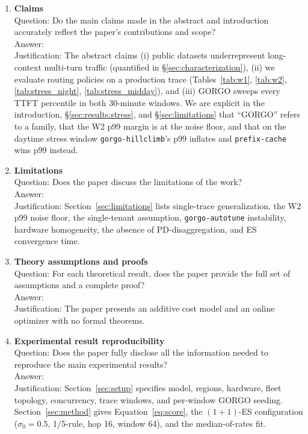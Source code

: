 \documentclass{article}
\begin{document}
\begin{enumerate}

\item {\bf Claims}\\
Question: Do the main claims made in the abstract and introduction accurately reflect the paper's contributions and scope?\\
Answer: \answerYes{}\\
Justification: The abstract claims (i) public datasets underrepresent long-context multi-turn traffic (quantified in \S\ref{sec:characterization}), (ii) we evaluate routing policies on a production trace (Tables~\ref{tab:w1}, \ref{tab:w2}, \ref{tab:stress_night}, \ref{tab:stress_midday}), and (iii) GORGO sweeps every TTFT percentile in both 30-minute windows. We are explicit in the introduction, \S\ref{sec:results:stress}, and \S\ref{sec:limitations} that ``GORGO'' refers to a family, that the W2 p99 margin is at the noise floor, and that on the daytime stress window \texttt{gorgo-hillclimb}'s p99 inflates and \texttt{prefix-cache} wins p99 instead.

\item {\bf Limitations}\\
Question: Does the paper discuss the limitations of the work?\\
Answer: \answerYes{}\\
Justification: Section~\ref{sec:limitations} lists single-trace generalization, the W2 p99 noise floor, the single-tenant assumption, \texttt{gorgo-autotune} instability, hardware homogeneity, the absence of PD-disaggregation, and ES convergence time.

\item {\bf Theory assumptions and proofs}\\
Question: For each theoretical result, does the paper provide the full set of assumptions and a complete proof?\\
Answer: \answerNA{}\\
Justification: The paper presents an additive cost model and an online optimizer with no formal theorems.

\item {\bf Experimental result reproducibility}\\
Question: Does the paper fully disclose all the information needed to reproduce the main experimental results?\\
Answer: \answerYes{}\\
Justification: Section~\ref{sec:setup} specifies model, regions, hardware, fleet topology, concurrency, trace windows, and per-window GORGO seeding. Section~\ref{sec:method} gives Equation~\ref{eq:score}, the $(1{+}1)$-ES configuration ($\sigma_0=0.5$, 1/5-rule, hop 16, window 64), and the median-of-rates fit. 


\end{enumerate}
\end{document}
